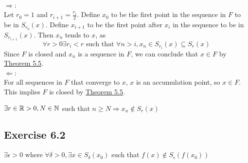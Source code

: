 
\begin{solution}
 \\$\Rightarrow$: \\
 Let $r_0 = 1$ and $r_{i+1} = \frac{r_i}{2}$. Define $x_0$ to be the first point in the sequence in $F$ to be in $S_{r_0}(x)$. Define $x_{i+1}$ to be the first point after $x_i$ in the sequence to be in $S_{r_{i+1}}(x)$. Then $x_n$ tends to $x$, as 
 $$\forall r > 0 \exists r_i < r \text{ such that } \forall n > i, x_n \in S_{r_i}(x) \subseteq S_r(x)$$
 Since $F$ is closed and $x_n$ is a sequence in $F$, we can conclude that $x \in F$ by \hyperref[thm3.5.5]{Theorem 5.5}. \\
 
 $\Leftarrow$: \\
 For all sequences in $F$ that converge to $x$, $x$ is an accumulation point, so $x \in F$. This implies $F$ is closed by \hyperref[thm3.5.5]{Theorem 5.5}.
\end{solution}


\begin{solution}
 $\exists r \in \mathbb{R} > 0, N \in \mathbb{N}$ such that $n \geq N \Rightarrow x_n \notin S_r(x)$
\end{solution}

\subsection{Exercise 6.2}


\begin{solution}
 $\exists \epsilon > 0$ where $\forall \delta > 0, \exists x \in S_\delta(x_0)$ such that $f(x) \notin S_\epsilon(f(x_0))$
\end{solution}


